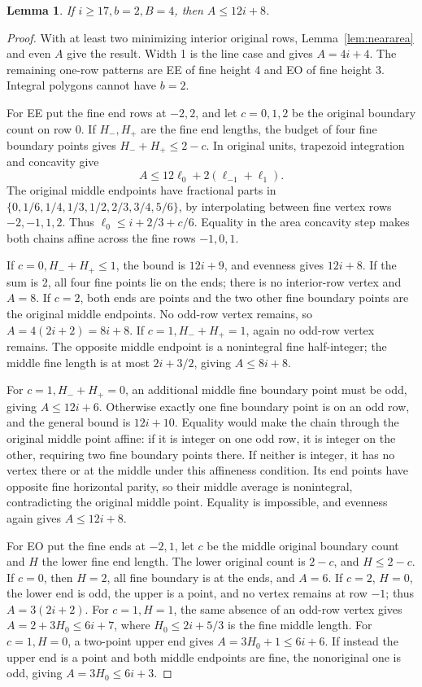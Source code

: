 \documentclass[11pt]{article}
\newtheorem{lemma}[theorem]{Lemma}
\begin{document}
\begin{lemma}\label{lem:B4}
If \(i\ge17,b=2,B=4\), then \(A\le12i+8\).
\end{lemma}
\begin{proof}
With at least two minimizing interior original rows,
Lemma~\ref{lem:neararea} and even \(A\) give the result.
Width 1 is the line case and gives \(A=4i+4\).
The remaining one-row patterns are EE of fine height 4 and EO of fine height 3.
Integral polygons cannot have \(b=2\).

For EE put the fine end rows at \(-2,2\), and let \(c=0,1,2\) be the
original boundary count on row 0. If \(H_-,H_+\) are the fine end lengths,
the budget of four fine boundary points gives \(H_-+H_+\le2-c\).
In original units, trapezoid integration and concavity give
\[
 A\le12\ell_0+2(\ell_{-1}+\ell_1).
\]
The original middle endpoints have fractional parts in
\(\{0,1/6,1/4,1/3,1/2,2/3,3/4,5/6\}\), by interpolating between fine
vertex rows \(-2,-1,1,2\). Thus \(\ell_0\le i+2/3+c/6\).
Equality in the area concavity step makes both chains affine across the
fine rows \(-1,0,1\).

If \(c=0,H_-+H_+\le1\), the bound is \(12i+9\), and evenness gives
\(12i+8\). If the sum is 2, all four fine points lie on the ends;
there is no interior-row vertex and \(A=8\).
If \(c=2\), both ends are points and the two other fine boundary points
are the original middle endpoints. No odd-row vertex remains, so
\(A=4(2i+2)=8i+8\).
If \(c=1,H_-+H_+=1\), again no odd-row vertex remains.
The opposite middle endpoint is a nonintegral fine half-integer;
the middle fine length is at most \(2i+3/2\), giving \(A\le8i+8\).

For \(c=1,H_-+H_+=0\), an additional middle fine boundary point must be
odd, giving \(A\le12i+6\). Otherwise exactly one fine boundary point
is on an odd row, and the general bound is \(12i+10\).
Equality would make the chain through the original middle point affine:
if it is integer on one odd row, it is integer on the other, requiring
two fine boundary points there. If neither is integer, it has no vertex
there or at the middle under this affineness condition. Its end points
have opposite fine horizontal parity, so their middle average is
nonintegral, contradicting the original middle point. Equality is impossible,
and evenness again gives \(A\le12i+8\).

For EO put the fine ends at \(-2,1\), let \(c\) be the middle original
boundary count and \(H\) the lower fine end length. The lower original
count is \(2-c\), and \(H\le2-c\).
If \(c=0\), then \(H=2\), all fine boundary is at the ends, and \(A=6\).
If \(c=2\), \(H=0\), the lower end is odd, the upper is a point, and
no vertex remains at row \(-1\); thus \(A=3(2i+2)\).
For \(c=1,H=1\), the same absence of an odd-row vertex gives
\(A=2+3H_0\le6i+7\), where \(H_0\le2i+5/3\) is the fine middle length.
For \(c=1,H=0\), a two-point upper end gives \(A=3H_0+1\le6i+6\).
If instead the upper end is a point and both middle endpoints are fine,
the nonoriginal one is odd, giving \(A=3H_0\le6i+3\).


\end{proof}
\end{document}
